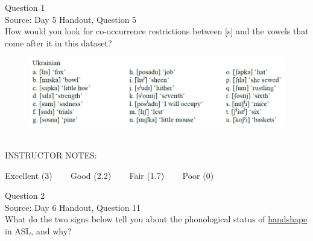 \documentclass[12pt]{article}
\begin{document}
{\large Question 1}\\

Source: Day 5 Handout, Question 5\\

How would you look for co-occurrence restrictions between [s] and the vowels that come after it in this dataset?\\

\begin{figure}[H]
\includegraphics{../images/ukrainian.png}
\end{figure}

~\\
INSTRUCTOR NOTES: 


\vfill
Excellent (3) ~~~ Good (2.2) ~~~ Fair (1.7) ~~~ Poor (0)
\newpage

{\large Question 2}\\

Source: Day 6 Handout, Question 11\\

What do the two signs below tell you about the phonological status of \underline{handshape} in ASL, and why?\\
\end{document}
